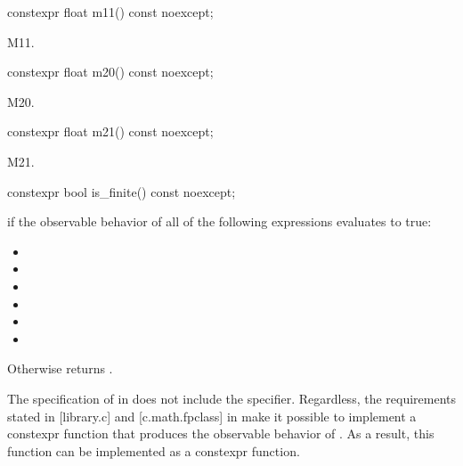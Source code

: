 %
\begin{itemdecl}
constexpr float m11() const noexcept;
\end{itemdecl}
\begin{itemdescr}
\pnum
\returns
M11.
\end{itemdescr}

%
\begin{itemdecl}
constexpr float m20() const noexcept;
\end{itemdecl}
\begin{itemdescr}
\pnum
\returns
M20.
\end{itemdescr}

%
\begin{itemdecl}
constexpr float m21() const noexcept;
\end{itemdecl}
\begin{itemdescr}
\pnum
\returns
M21.
\end{itemdescr}

%
\begin{itemdecl}
constexpr bool is_finite() const noexcept;
\end{itemdecl}
\begin{itemdescr}
\pnum
\returns
{} if the observable behavior of all of the following expressions evaluates to true:
\begin{itemize}
\item {}
\item {}
\item {}
\item {}
\item {}
\item {}
\end{itemize}

\pnum
Otherwise returns .

\pnum
\begin{note}
The specification of  in \cppseventeen does not include the  specifier. Regardless, the requirements stated in [library.c] and [c.math.fpclass] in \cppseventeen make it possible to implement a constexpr function that produces the observable behavior of . As a result, this function can be implemented as a constexpr function.
\end{note}
\end{itemdescr}

